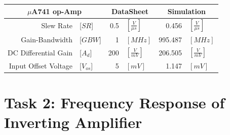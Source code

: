 \documentclass[11pt,a4paper]{article}
\begin{document}
\begin{enumerate}
\begin{minipage}{\linewidth}
\begin{center}
  \begin{tabular}{r l r l r l}
	\multicolumn{2}{c}{$\mu$A741 op-Amp} &   
  \multicolumn{2}{c}{DataSheet} &
  \multicolumn{2}{c}{Simulation}\\
  \hline
    Slew Rate & [$SR$] & 0.5 & $ [\frac{V}{\mu s}]$ & 0.456& $      [\frac{V}{\mu s}]$ \\
  Gain-Bandwidth & [$GBW$]& 1 &$ [MHz]$  & 995.487 &$ [MHz]$ \\
  DC Differential Gain &[$A_{d}$] & 200& $[\frac{V}{mV}]$ & 206.505& $[\frac{V}{mV}]$ \\
  Input Offset Voltage &[$V_{os}$] & 5& $[mV]$& 1.147& $[mV]$ \\
    \end{tabular}
\end{center}
\end{minipage}
\end{enumerate}

\section*{Task 2: Frequency Response of Inverting Amplifier}
\end{document}
